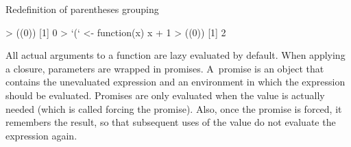 \begin{listing}[htbp]
  \caption{\label{lst:paren-redef}Redefinition of parentheses grouping}
  \begin{rcode}
> ((0))
[1] 0
> `(` <- function(x) x + 1
> ((0))
[1] 2
  \end{rcode}
\end{listing}

All actual arguments to a function are lazy evaluated by default. When applying a closure, parameters are wrapped in promises. A~promise is an object that contains the unevaluated expression and an environment in which the expression should be evaluated. Promises are only evaluated when the value is actually needed (which is called forcing the promise). Also, once the promise is forced, it remembers the result, so that subsequent uses of the value do not evaluate the expression again.

